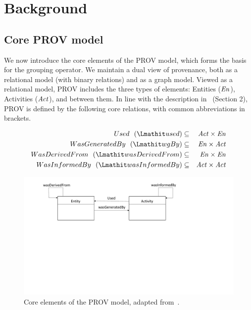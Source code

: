 
\section{Background}
\label{sec:prov-background}

\subsection{Core PROV model} \label{sec:prov-core}

We now introduce the core elements of the PROV model, which forms the basis for the grouping operator.
%
We maintain a dual view of provenance, both as a relational model (with binary relations) and as a graph model. Viewed as a relational model, PROV includes the three types of elements: Entities ($\mathit{En}$), Activities ($\mathit{Act}$),  and  between them. 
In line with the description in~\citep{w3c-prov-dm} (Section 2), PROV is defined by the following core relations, with common abbreviations in brackets. 

\begin{eqnarray*}
Used~~(\used)  & \subseteq & \act \times \en \\
WasGeneratedBy~~(\wgby) & \subseteq  & \en \times \act \\
WasDerivedFrom~~(\wdf) & \subseteq   & \en \times \en \\
WasInformedBy~~(\wasInfBy) & \subseteq & \act \times \act
\end{eqnarray*}


\begin{figure}
\centering
\includegraphics[scale=.45]{figures/prov-essentials.pdf} 
\caption{Core elements of the PROV model, adapted from~\citep{w3c-prov-dm}.}
\label{fig:prov-core}
\end{figure}

